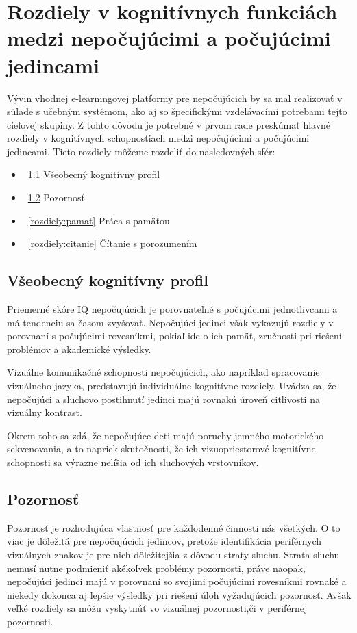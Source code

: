 \documentclass[10pt,oneside,slovak,a4paper]{article}
\begin{document}
\section{Rozdiely v kognitívnych funkciách medzi nepočujúcimi a počujúcimi jedincami} \label{rozdiely}
Vývin vhodnej e-learningovej platformy pre nepočujúcich by sa mal realizovať v súlade s učebným systémom, ako aj so špecifickými vzdelávacími potrebami  tejto cieľovej skupiny. Z tohto dôvodu je potrebné v prvom rade preskúmať hlavné rozdiely v kognitívnych schopnostiach medzi nepočujúcimi a počujúcimi jedincami.\linebreak
Tieto rozdiely môžeme rozdeliť do nasledovných sfér:
\begin{itemize}
\item ~\ref{rozdiely:vseob} Všeobecný kognitívny profil
\item ~\ref{rozdiely:pozornost} Pozornosť
\item ~\ref{rozdiely:pamat} Práca s pamäťou
\item ~\ref{rozdiely:citanie} Čítanie s porozumením
\end{itemize}



\subsection{Všeobecný kognitívny profil} \label{rozdiely:vseob}
Priemerné skóre IQ nepočujúcich je porovnateľné s počujúcimi jednotlivcami a má tendenciu sa časom zvyšovať. Nepočujúci jedinci však vykazujú rozdiely v porovnaní s počujúcimi rovesníkmi, pokiaľ ide o ich pamäť, zručnosti pri riešení problémov a akademické výsledky.

Vizuálne komunikačné schopnosti nepočujúcich, ako napríklad spracovanie vizuálneho jazyka, predstavujú individuálne kognitívne rozdiely. Uvádza sa, že nepočujúci a sluchovo postihnutí jedinci majú rovnakú úroveň citlivosti na vizuálny kontrast.

Okrem toho sa zdá, že nepočujúce deti majú poruchy jemného motorického sekvenovania, a to napriek skutočnosti, že ich vizuopriestorové kognitívne schopnosti sa výrazne nelíšia od ich sluchových vrstovníkov\cite{pappas2018learning}.


\subsection{Pozornosť} \label{rozdiely:pozornost}
Pozornosť je rozhodujúca vlastnosť pre každodenné činnosti nás všetkých. O to viac je dôležitá pre nepočujúcich jedincov, pretože identifikácia periférnych vizuálnych znakov je pre nich dôležitejšia z dôvodu straty sluchu. Strata sluchu nemusí nutne podmieniť akékoľvek problémy pozornosti, práve naopak, nepočujúci jedinci majú v porovnaní so svojimi počujúcimi rovesníkmi rovnaké a niekedy dokonca aj lepšie výsledky pri riešení úloh vyžadujúcich pozornosť. Avšak veľké rozdiely sa môžu vyskytnúť vo vizuálnej pozornosti,či v periférnej pozornosti\cite{pappas2018learning}.
\end{document}
